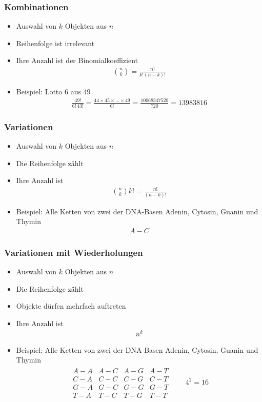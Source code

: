\begin{frame}
  \frametitle{Kombinationen}
  \begin{itemize}
  \item Auswahl von $k$ Objekten aus $n$
  \item Reihenfolge ist irrelevant
  \item Ihre Anzahl ist der Binomialkoeffizient
    \begin{gather*}
      \binom{n}{k} = \frac{n!}{k!(n-k)!}
    \end{gather*}
  \item Beispiel: Lotto 6 aus 49
    \begin{gather*}
      \frac{49!}{6!\,43!} = \frac{44\times 45\times \dots\times 49}{6!}
      = \frac{10068347520}{720} = 13983816
    \end{gather*}
  \end{itemize}
\end{frame}    

\begin{frame}
  \frametitle{Variationen}
  \begin{itemize}
  \item Auswahl von $k$ Objekten aus $n$
  \item Die Reihenfolge zählt
  \item Ihre Anzahl ist
    \begin{gather*}
      \binom{n}{k}k! = \frac{n!}{(n-k)!}
    \end{gather*}
  \item Beispiel: Alle Ketten von zwei der DNA-Basen Adenin, Cytosin, Guanin und Thymin
    \begin{gather*}
      A-C 
    \end{gather*}
  \end{itemize}

\end{frame}

\begin{frame}
  \frametitle{Variationen mit Wiederholungen}
  \begin{itemize}
  \item Auswahl von $k$ Objekten aus $n$
  \item Die Reihenfolge zählt
  \item Objekte dürfen mehrfach auftreten
  \item Ihre Anzahl ist
    \begin{gather*}
      n^k
    \end{gather*}
  \item Beispiel: Alle Ketten von zwei der DNA-Basen Adenin, Cytosin, Guanin und Thymin
    \begin{gather*}
      \begin{matrix}
        A-A& A-C& A-G& A-T\\
        C-A& C-C& C-G& C-T\\
        G-A& G-C& G-G& G-T\\
        T-A& T-C& T-G& T-T
      \end{matrix}
      \qquad 4^2=16
    \end{gather*}
  \end{itemize}
\end{frame}

